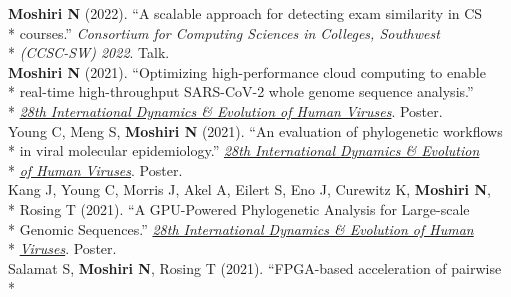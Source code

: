 \documentclass[margin,line]{res}
\begin{document}
\begin{resume}
\hspace*{4mm} \textbf{Moshiri N} (2022). ``A scalable approach for detecting exam similarity in CS\\*
\hspace*{9.5mm} courses.'' \textit{Consortium for Computing Sciences in Colleges, Southwest}\\*\vspace{2mm}
\hspace*{8mm} \textit{(CCSC-SW) 2022}. Talk.\\
\hspace*{4mm} \textbf{Moshiri N} (2021). ``Optimizing high-performance cloud computing to enable\\*
\hspace*{9.5mm} real-time high-throughput SARS-CoV-2 whole genome sequence analysis.''\\*\vspace{2mm}
\hspace*{8mm} \href{https://cpd.ucsd.edu/hivdynamics/}{\textit{28th International Dynamics \& Evolution of Human Viruses}}. Poster.\\
\hspace*{4mm} Young C, Meng S, \textbf{Moshiri N} (2021). ``An evaluation of phylogenetic workflows\\*
\hspace*{9.5mm} in viral molecular epidemiology.'' \href{https://cpd.ucsd.edu/hivdynamics/}{\textit{28th International Dynamics \& Evolution}}\\*\vspace{2mm}
\hspace*{8mm} \href{https://cpd.ucsd.edu/hivdynamics/}{\textit{of Human Viruses}}. Poster.\\
\hspace*{4mm} Kang J, Young C, Morris J, Akel A, Eilert S, Eno J, Curewitz K, \textbf{Moshiri N},\\*
\hspace*{9.5mm}  Rosing T (2021). ``A GPU-Powered Phylogenetic Analysis for Large-scale\\*
\hspace*{9.5mm} Genomic Sequences.'' \href{https://cpd.ucsd.edu/hivdynamics/}{\textit{28th International Dynamics \& Evolution of Human}}\\*\vspace{2mm}
\hspace*{7.5mm} \href{https://cpd.ucsd.edu/hivdynamics/}{\textit{Viruses}}. Poster.\\
\hspace*{4mm} Salamat S, \textbf{Moshiri N}, Rosing T (2021). ``FPGA-based acceleration of pairwise\\*

\end{resume}
\end{document}
